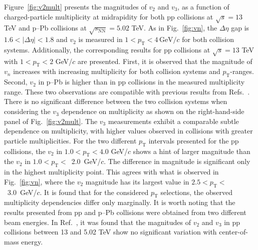 Figure~\ref{fig:v2mult} presents the magnitudes of $v_2$ and $v_3$, as a function of charged-particle multiplicity at midrapidity for both pp collisions at $\sqrt{s}=13$ TeV and p--Pb collisions at $\sqrt{s_\mathrm{NN}}=5.02$ TeV. As in Fig.~\ref{fig:vn}, the $\Delta\eta$ gap is $1.6<|\Delta\eta|<1.8$ and $v_2$ is measured in $1<p_{\mathrm{T}}<4\,\mathrm{GeV}/c$ for both collision systems. Additionally, the corresponding results for pp collisions at $\sqrt{s}=13$ TeV with $1<p_{\mathrm{T}}<2$ GeV/$c$ are presented. First, it is observed that the magnitude of $v_n$ increases with increasing multiplicity for both collision systems and $p_\mathrm{T}$-ranges. Second, $v_2$ in p--Pb is higher than in pp collisions in the measured multiplicity range. These two observations are compatible with previous results from Refs.~\cite{ATLAS:2015hzw,ATLAS:2016yzd, Khachatryan:2015lva}. There is no significant difference between the two collision systems when considering the $v_3$ dependence on multiplicity as shown on the right-hand-side panel of Fig.~\ref{fig:v2mult}. The $v_3$ measurements exhibit a comparable subtle dependence on multiplicity, with higher values observed in collisions with greater particle multiplicities.
For the two different $p_\mathrm{T}$ intervals presented for the pp collisions, the $v_2$ in $1.0<p_\mathrm{T}<4.0$ GeV/$c$ shows a hint of larger magnitude than the $v_2$ in $1.0<p_\mathrm{T}<$~2.0~GeV/$c$. The difference in magnitude is significant only in the highest multiplicity point. 
This agrees with what is observed in Fig.~\ref{fig:vn}, where the $v_2$ magnitude has its largest value in $2.5<p_\mathrm{T}<$~3.0~GeV/$c$. It is found that for the considered $p_\mathrm{T}$ selections, the observed multiplicity dependencies differ only marginally. 
It is worth noting that the results presented from pp and p--Pb collisions were obtained from two different beam energies. In Ref.~\cite{ATLAS:2016yzd}, it was found that the magnitudes of $v_2$ and $v_3$ in pp collisions between 13 and 5.02 TeV show no significant variation with center-of-mass energy.

